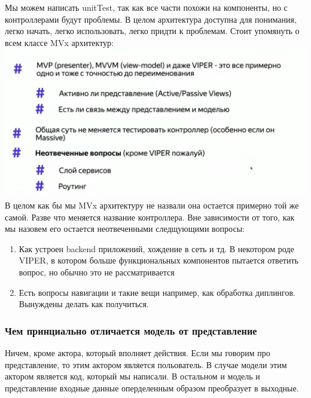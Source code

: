 \documentclass{article}
\begin{document}
    Мы можем написать unitTest, так как все части похожи на компоненты, но с контроллерами будут проблемы.
    \newline
    В целом архитектура доступна для понимания, легко начать, легко использовать, легко придти к проблемам. 
    \newline
    Стоит упомянуть о всем классе MVx архитектур: 
    \newline
    \includegraphics[scale = 0.5]{pic/Снимок экрана 2023-07-30 в 18.59.53.png}
    \newline
    В целом как бы мы MVx архитектуру не назвали она остается примерно той же самой. Разве что меняется название контроллера. Вне зависимости от того, как мы назовем его остается неотвеченными следщующими вопросы: 
    \begin{enumerate}
        \item Как устроен backend приложений, хождение в сеть и тд. В некотором роде VIPER, в котором больше функциональных компонентов пытается ответить вопрос, но обычно это не рассматривается
        \item  Есть вопросы навигации и такие вещи например, как обработка диплингов. Вынуждены делать как получиться. 
    \end{enumerate}
    
    \subsubsection{Чем принциально отличается модель от представление}
    Ничем, кроме актора, который вполняет действия. Если мы говорим про представление, то этим актором является польователь. В случае модели этим актором является код, который мы написали. В остальном и модель и представление входные данные оперделенным образом преобразует в выходные.
\end{document}
